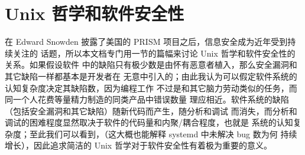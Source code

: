 \section{Unix 哲学和软件安全性}\label{sec:security}

在 Edward Snowden 披露了美国的 PRISM 项目之后，信息安全成为近年受到持续关注的
话题，所以本文档专门用一节的篇幅来讨论 Unix 哲学和软件安全性的关系。如果假设软件
中的缺陷只有极少数是由怀有恶意者植入，那么安全漏洞和其它缺陷一样都基本是开发者在
无意中引入的；由此我认为可以假定软件系统的认知复杂度决定其缺陷数，因为编程工作
不过是和其它脑力劳动类似的任务，而同一个人花费等量精力制造的同类产品中错误数量
理应相近。软件系统的缺陷（包括安全漏洞和其它缺陷）随新代码而产生，随分析和调试
而消失，而分析和调试的困难程度显然取决于软件的代码量和内聚/耦合程度，也就是
系统的认知复杂度；至此我们可以看到，（这大概也能解释 systemd 中未解决 bug 数为何
持续增长），因此追求简洁的 Unix 哲学对于软件安全性有着极为重要的意义。

